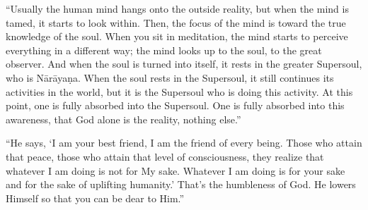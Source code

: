 \enquote{Usually the human mind hangs onto the outside reality, but when the mind is tamed, it starts to look within. Then, the focus of the mind is toward the true knowledge of the soul. When you sit in meditation, the mind starts to perceive everything in a different way; the mind looks up to the soul, to the great observer. And when the soul is turned into itself, it rests in the greater Supersoul, who is Nārāyaṇa. When the soul rests in the Supersoul, it still continues its activities in the world, but it is the Supersoul who is doing this activity. At this point, one is fully absorbed into the Supersoul. One is fully absorbed into this awareness, that God alone is the reality, nothing else.}

\enquote{He says, \enquote{I am your best friend, I am the friend of every being. Those who attain that peace, those who attain that level of consciousness, they realize that whatever I am doing is not for My sake. Whatever I am doing is for your sake and for the sake of uplifting humanity.} That’s the humbleness of God. He lowers Himself so that you can be dear to Him.}
